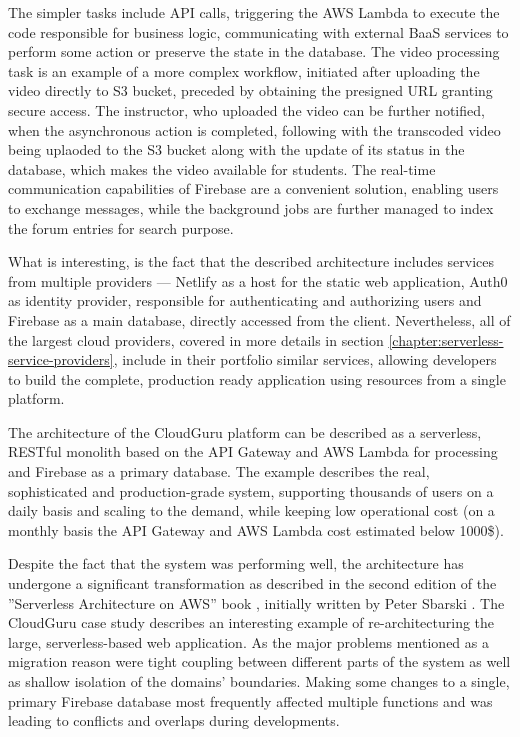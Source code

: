 The simpler tasks include API calls, triggering the AWS Lambda to execute the code responsible for business logic, communicating with external BaaS services to perform some action or preserve the state in the database.
The video processing task is an example of a more complex workflow, initiated after uploading the video directly to S3 bucket, preceded by obtaining the presigned URL granting secure access.
The instructor, who uploaded the video can be further notified, when the asynchronous action is completed, following with the transcoded video being uplaoded to the S3 bucket along with the update of its status in the database, which makes the video available for students.
The real-time communication capabilities of Firebase are a convenient solution, enabling users to exchange messages, while the background jobs are further managed to index the forum entries for search purpose.

What is interesting, is the fact that the described architecture includes services from multiple providers --- Netlify as a host for the static web application, Auth0 as identity provider, responsible for authenticating and authorizing users and Firebase as a main database, directly accessed from the client. Nevertheless, all of the largest cloud providers, covered in more details in section \ref{chapter:serverless-service-providers}, include in their portfolio similar services, allowing developers to build the complete, production ready application using resources from a single platform.

The architecture of the CloudGuru platform can be described as a serverless, RESTful monolith based on the API Gateway and AWS Lambda for processing and Firebase as a primary database.
The example describes the real, sophisticated and production-grade system, supporting thousands of users on a daily basis and scaling to the demand, while keeping low operational cost (on a monthly basis the API Gateway and AWS Lambda cost estimated below 1000\$).

Despite the fact that the system was performing well, the architecture has undergone a significant transformation as described in the second edition of the ''Serverless Architecture on AWS'' book \cite{ServerlessArchitectureOnAWSSecondEdition}, initially written by Peter Sbarski \cite{ServerlessArchitectureOnAWS}.
The CloudGuru case study describes an interesting example of re-architecturing the large, serverless-based web application.
As the major problems mentioned as a migration reason were tight coupling between different parts of the system as well as shallow isolation of the domains' boundaries.
Making some changes to a single, primary Firebase database most frequently affected multiple functions and was leading to conflicts and overlaps during developments.


